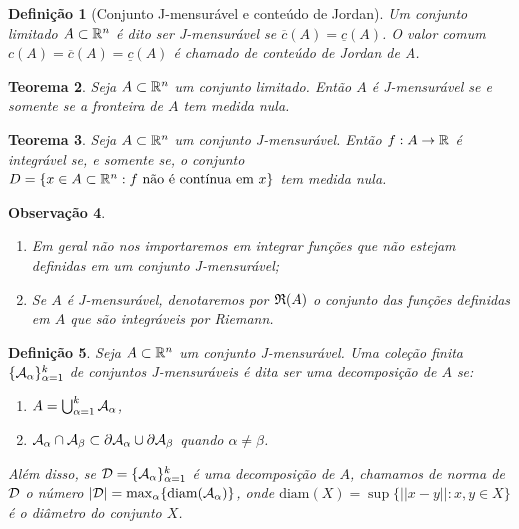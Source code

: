 \documentclass[a4paper,12pt]{extreport}
\newtheorem{mydef}{Definição}
\newtheorem{myobs}[mydef]{Observação}
\newtheorem{myteo}[mydef]{Teorema}
\newif\ifspacesbetweentheos
\newcommand{\theospace}[1]{
\ifspacesbetweentheos
  \vspace{#1}
\fi
}
\newcommand{\theonewpage}{
\ifspacesbetweentheos
  \newpage
\fi
}
\begin{document}
\begin{mydef}[Conjunto J-mensurável e conteúdo de Jordan]
  Um conjunto limitado $A \subset \mathbb{R}^n$
  é dito ser \emph{J-mensurável}
  se $\overline{c}(A) = \underline{c}(A)$.
  O valor comum
  $c(A) = \overline{c}(A) = \underline{c}(A)$
  é chamado de \emph{conteúdo de Jordan} de A.
\end{mydef}


\theonewpage


\begin{myteo}
  Seja $A \subset \mathbb{R}^n$ um conjunto limitado.
  Então $A$ é J-mensurável se e somente se a fronteira de $A$
  tem medida nula.
\end{myteo}

\theospace{9.5cm}


\begin{myteo}
  Seja $A \subset \mathbb{R}^n$ um conjunto J-mensurável.
  Então $f:A \to \mathbb{R}$ é integrável se, e somente se,
  o conjunto
  $D = \{ x \in A \subset \mathbb{R}^n : f \text{ não é contínua em } x\}$
  tem medida nula.
\end{myteo}


\theospace{9.5cm}


\begin{myobs}
  \begin{enumerate}[label=\alph*)]
  \item 
    Em geral não nos importaremos em integrar
    funções que não estejam definidas em um conjunto J-mensurável;
    
  \item Se $A$ é J-mensurável,
    denotaremos por $\mathfrak{R}(A)$
    o conjunto das funções definidas em $A$
    que são integráveis por Riemann.
  \end{enumerate}
\end{myobs}


\theonewpage


\begin{mydef}
  Seja $A \subset \mathbb{R}^n$ um conjunto J-mensurável.
  Uma coleção finita $\{\mathcal{A}_\alpha\}_{\alpha=1}^k$
  de conjuntos J-mensuráveis é dita ser uma
  \emph{decomposição} de $A$ se:
  \begin{enumerate}[label=\alph*)]
  \item $A = \bigcup_{\alpha=1}^k \mathcal{A}_\alpha$,
  \item $\mathcal{A}_\alpha \cap \mathcal{A}_\beta \subset
    \partial \mathcal{A}_\alpha \cup \partial \mathcal{A}_\beta$
    quando $\alpha \ne \beta$.
  \end{enumerate}  
  Além disso, se $\mathcal{D} = \{\mathcal{A}_\alpha\}_{\alpha=1}^k$
  é uma decomposição de $A$,
  chamamos de \emph{norma} de $\mathcal{D}$
  o número $|\mathcal{D}| = \max_{\alpha} \{\mathrm{diam}(\mathcal{A}_\alpha)\}$,
  onde $\mathrm{diam}(X) = \sup\{||x-y||: x, y \in X\}$
  é o \emph{diâmetro} do conjunto $X$.
\end{mydef}
\end{document}
